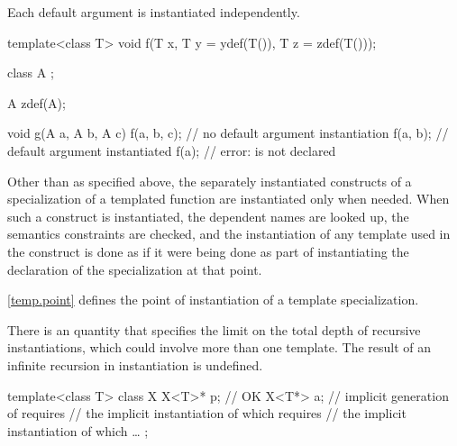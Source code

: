 \pnum
\begin{note}
Each default argument is instantiated independently.
\end{note}
\begin{example}
\begin{codeblock}
template<class T> void f(T x, T y = ydef(T()), T z = zdef(T()));

class  A { };

A zdef(A);

void g(A a, A b, A c) {
  f(a, b, c);       // no default argument instantiation
  f(a, b);          // default argument  instantiated
  f(a);             // error:  is not declared
}
\end{codeblock}
\end{example}

\pnum
Other than as specified above,
the separately instantiated constructs
of a specialization of a templated function
are instantiated only when needed.
When such a construct is instantiated,
the dependent names are looked up,
the semantics constraints are checked, and
the instantiation of any template used in the construct
is done as if it were being done as part of instantiating the declaration
of the specialization at that point.

\pnum
\begin{note}
\ref{temp.point} defines the point of instantiation of a template specialization.
\end{note}

\pnum
There is an  quantity
that specifies the limit on the total depth of recursive instantiations,
which could involve more than one template.
The result of an infinite recursion in instantiation is undefined.
\begin{example}
\begin{codeblock}
template<class T> class X {
  X<T>* p;          // OK
  X<T*> a;          // implicit generation of  requires
                    // the implicit instantiation of  which requires
                    // the implicit instantiation of  which \ldots
};
\end{codeblock}
\end{example}

